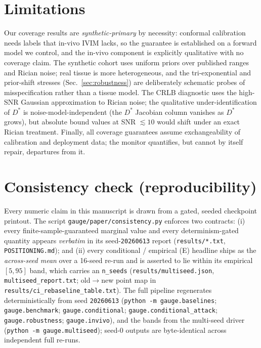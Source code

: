 \documentclass[11pt]{article}
\newcommand{\Dstar}{D^{*}}
\begin{document}
\section{Limitations}
Our coverage results are \emph{synthetic-primary} by necessity: conformal
calibration needs labels that in-vivo IVIM lacks, so the guarantee is established
on a forward model we control, and the in-vivo component is explicitly qualitative
with no coverage claim. The synthetic cohort uses uniform priors over published
ranges and Rician noise; real tissue is more heterogeneous, and the
tri-exponential and prior-shift stresses (Sec.~\ref{sec:robustness}) are
deliberately schematic probes of misspecification rather than a tissue model. The
CRLB diagnostic uses the high-SNR Gaussian approximation to Rician noise; the
qualitative under-identification of $\Dstar$ is noise-model-independent (the
$\Dstar$ Jacobian column vanishes as $\Dstar$ grows), but absolute bound values at
SNR $\lesssim10$ would shift under an exact Rician treatment. Finally, all coverage
guarantees assume exchangeability of calibration and deployment data; the monitor
quantifies, but cannot by itself repair, departures from it.

\section{Consistency check (reproducibility)}
\label{sec:consistency}
Every numeric claim in this manuscript is drawn from a gated, seeded checkpoint
printout. The script \texttt{gauge/paper/consistency.py} enforces two contracts:
(i) every finite-sample-guaranteed marginal value and every determinism-gated
quantity appears \emph{verbatim} in its seed-\texttt{20260613} report
(\texttt{results/*.txt}, \texttt{POSITIONING.md}); and (ii) every conditional /
empirical (E) headline ships as the \emph{across-seed mean} over a 16-seed re-run
and is asserted to lie within its empirical $[5,95]$ band, which carries an
\texttt{n\_seeds} (\texttt{results/multiseed.json}, \texttt{multiseed\_report.txt};
old$\to$new point map in \texttt{results/ci\_rebaseline\_table.txt}). The full
pipeline regenerates deterministically from seed \texttt{20260613}
(\texttt{python -m gauge.baselines}; \texttt{gauge.benchmark};
\texttt{gauge.conditional}; \texttt{gauge.conditional\_attack};
\texttt{gauge.robustness}; \texttt{gauge.invivo}), and the bands from the multi-seed
driver (\texttt{python -m gauge.multiseed}); seed-0 outputs are byte-identical
across independent full re-runs.
\end{document}
